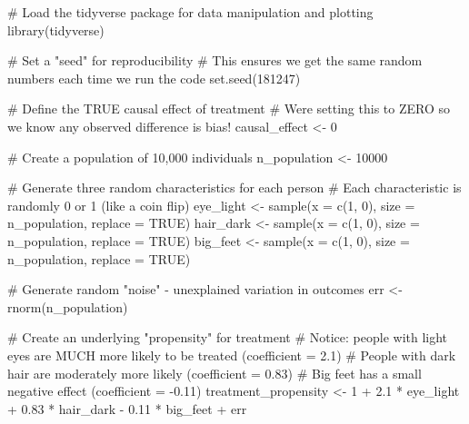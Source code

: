 \documentclass[
  letterpaper,
  DIV=11,
  numbers=noendperiod]{scrreprt}
\newenvironment{Shaded}{\begin{snugshade}}{\end{snugshade}}
\newcommand{\AttributeTok}[1]{\textcolor[rgb]{0.40,0.45,0.13}{#1}}
\newcommand{\CommentTok}[1]{\textcolor[rgb]{0.37,0.37,0.37}{#1}}
\newcommand{\ConstantTok}[1]{\textcolor[rgb]{0.56,0.35,0.01}{#1}}
\newcommand{\DecValTok}[1]{\textcolor[rgb]{0.68,0.00,0.00}{#1}}
\newcommand{\FloatTok}[1]{\textcolor[rgb]{0.68,0.00,0.00}{#1}}
\newcommand{\FunctionTok}[1]{\textcolor[rgb]{0.28,0.35,0.67}{#1}}
\newcommand{\NormalTok}[1]{\textcolor[rgb]{0.00,0.23,0.31}{#1}}
\newcommand{\OtherTok}[1]{\textcolor[rgb]{0.00,0.23,0.31}{#1}}
\newcommand{\SpecialCharTok}[1]{\textcolor[rgb]{0.37,0.37,0.37}{#1}}
\begin{document}
\begin{Shaded}
\begin{Highlighting}[]
\CommentTok{\# Load the tidyverse package for data manipulation and plotting}
\FunctionTok{library}\NormalTok{(tidyverse)}

\CommentTok{\# Set a "seed" for reproducibility}
\CommentTok{\# This ensures we get the same random numbers each time we run the code}
\FunctionTok{set.seed}\NormalTok{(}\DecValTok{181247}\NormalTok{)}

\CommentTok{\# Define the TRUE causal effect of treatment}
\CommentTok{\# We\textquotesingle{}re setting this to ZERO so we know any observed difference is bias!}
\NormalTok{causal\_effect }\OtherTok{\textless{}{-}} \DecValTok{0}

\CommentTok{\# Create a population of 10,000 individuals}
\NormalTok{n\_population }\OtherTok{\textless{}{-}} \DecValTok{10000}

\CommentTok{\# Generate three random characteristics for each person}
\CommentTok{\# Each characteristic is randomly 0 or 1 (like a coin flip)}
\NormalTok{eye\_light }\OtherTok{\textless{}{-}} \FunctionTok{sample}\NormalTok{(}\AttributeTok{x =} \FunctionTok{c}\NormalTok{(}\DecValTok{1}\NormalTok{, }\DecValTok{0}\NormalTok{), }\AttributeTok{size =}\NormalTok{ n\_population, }\AttributeTok{replace =} \ConstantTok{TRUE}\NormalTok{)}
\NormalTok{hair\_dark }\OtherTok{\textless{}{-}} \FunctionTok{sample}\NormalTok{(}\AttributeTok{x =} \FunctionTok{c}\NormalTok{(}\DecValTok{1}\NormalTok{, }\DecValTok{0}\NormalTok{), }\AttributeTok{size =}\NormalTok{ n\_population, }\AttributeTok{replace =} \ConstantTok{TRUE}\NormalTok{)}
\NormalTok{big\_feet }\OtherTok{\textless{}{-}} \FunctionTok{sample}\NormalTok{(}\AttributeTok{x =} \FunctionTok{c}\NormalTok{(}\DecValTok{1}\NormalTok{, }\DecValTok{0}\NormalTok{), }\AttributeTok{size =}\NormalTok{ n\_population, }\AttributeTok{replace =} \ConstantTok{TRUE}\NormalTok{)}

\CommentTok{\# Generate random "noise" {-} unexplained variation in outcomes}
\NormalTok{err }\OtherTok{\textless{}{-}} \FunctionTok{rnorm}\NormalTok{(n\_population)}

\CommentTok{\# Create an underlying "propensity" for treatment}
\CommentTok{\# Notice: people with light eyes are MUCH more likely to be treated (coefficient = 2.1)}
\CommentTok{\# People with dark hair are moderately more likely (coefficient = 0.83)}
\CommentTok{\# Big feet has a small negative effect (coefficient = {-}0.11)}
\NormalTok{treatment\_propensity }\OtherTok{\textless{}{-}} \DecValTok{1} \SpecialCharTok{+} \FloatTok{2.1} \SpecialCharTok{*}\NormalTok{ eye\_light }\SpecialCharTok{+} \FloatTok{0.83} \SpecialCharTok{*}\NormalTok{ hair\_dark }\SpecialCharTok{{-}} \FloatTok{0.11} \SpecialCharTok{*}\NormalTok{ big\_feet }\SpecialCharTok{+}\NormalTok{ err}


\end{Highlighting}
\end{Shaded}
\end{document}

